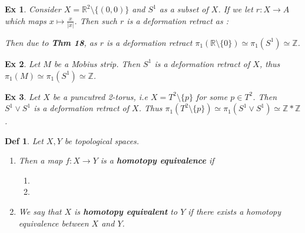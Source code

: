 \documentclass[paper=a4, fontsize=11pt]{scrartcl}
\newtheorem{definition}{Def}
\newtheorem{example}{Ex}
\begin{document}
\vspace{0.15in}

\begin{example}
Consider $X=\mathbb{R}^2 \setminus \{(0,0)\}$ and $S^1$ as a subset of $X$. If we let $r:X \to A$ which maps $x \mapsto \frac{x}{|x|}$. Then such $r$ is a deformation retract as :
Then due to \textbf{Thm 18}, as $r$ is a deformation retract  $\pi_1\left(\mathbb{R}\setminus \{0\} \right) \simeq \pi_1 \left( S^1 \right) \simeq \mathbb{Z}$.
\end{example}

\vspace{0.15in}

\begin{example}
	Let $M$ be a M$\ddot{o}$bius strip. Then $S^1$ is a deformation retract of $X$, thus $\pi_1(M)\simeq\pi_1(S^1)\simeq \mathbb{Z}$.
\end{example}

\vspace{0.15in}

\begin{example}
	Let $X$ be a puncutred 2-torus, i.e $X=T^2\setminus \{ p \}$ for some $p \in T^2$. Then $S^1 \vee S^1$ is a deformation retract of $X$. Thus $\pi_1\left( T^2 \setminus \{p\} \right) \simeq \pi_1 \left( S^1 \vee S^1 \right) \simeq \mathbb{Z} \ast \mathbb{Z}$.
\end{example}

\vspace{0.15in}

\begin{definition}
Let $X,Y$ be topological spaces. 
\begin{enumerate}[label=(\arabic*)]
	\item Then a map $f:X\to Y$ is a \textbf{homotopy equivalence} if 
	\begin{enumerate}[label=\roman*)]
		\item 
		\item 
	\end{enumerate}
	\item We say that $X$ is \textbf{homotopy equivalent} to $Y$ if there exists a homotopy equivalence between $X$ and $Y$.
\end{enumerate}
\end{definition}
\end{document}
